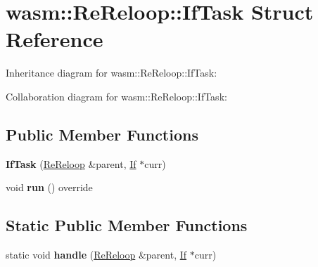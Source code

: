 \hypertarget{structwasm_1_1_re_reloop_1_1_if_task}{}\section{wasm\+:\+:Re\+Reloop\+:\+:If\+Task Struct Reference}
\label{structwasm_1_1_re_reloop_1_1_if_task}


Inheritance diagram for wasm\+:\+:Re\+Reloop\+:\+:If\+Task\+:


Collaboration diagram for wasm\+:\+:Re\+Reloop\+:\+:If\+Task\+:
\subsection*{Public Member Functions}
\begin{DoxyCompactItemize}
\item 
\mbox{\label{structwasm_1_1_re_reloop_1_1_if_task_a9a41e65c3d58cc8d88ed2eeda82b61c5}} 
{\bfseries If\+Task} (\mbox{\hyperlink{structwasm_1_1_re_reloop}{Re\+Reloop}} \&parent, \mbox{\hyperlink{classwasm_1_1_if}{If}} $\ast$curr)
\item 
\mbox{\label{structwasm_1_1_re_reloop_1_1_if_task_aae9a1e6f84e65e28d59b467f46e75287}} 
void {\bfseries run} () override
\end{DoxyCompactItemize}
\subsection*{Static Public Member Functions}
\begin{DoxyCompactItemize}
\item 
\mbox{\label{structwasm_1_1_re_reloop_1_1_if_task_a2bb9fe08de97c1b74aff441cd97a3873}} 
static void {\bfseries handle} (\mbox{\hyperlink{structwasm_1_1_re_reloop}{Re\+Reloop}} \&parent, \mbox{\hyperlink{classwasm_1_1_if}{If}} $\ast$curr)
\end{DoxyCompactItemize}
